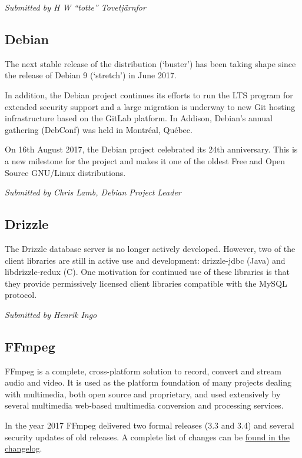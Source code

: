 \documentclass[a4paper]{report}
\begin{document}
{\em Submitted by H W ``totte'' Tovetjärnfor}

\subsection{Debian}

The next stable release of the distribution (`buster') has been taking
shape since the release of Debian 9 (`stretch') in June 2017.

In addition, the Debian project continues its efforts to run the LTS
program for extended security support and a large migration is underway
to new Git hosting infrastructure based on the GitLab platform. In
Addison, Debian's annual gathering (DebConf) was held in Montréal,
Québec.

On 16th August 2017, the Debian project celebrated its 24th anniversary.
This is a new milestone for the project and makes it one of the oldest
Free and Open Source GNU/Linux distributions.

{\em Submitted by Chris Lamb, Debian Project Leader}

\subsection{Drizzle}

The Drizzle database server is no longer actively developed. However,
two of the client libraries are still in active use and development:
drizzle-jdbc (Java) and libdrizzle-redux (C). One motivation for
continued use of these libraries is that they provide permissively
licensed client libraries compatible with the MySQL protocol.

{\em Submitted by Henrik Ingo}

\subsection{FFmpeg}

FFmpeg is a complete, cross-platform solution to record, convert and
stream audio and video. It is used as the platform foundation of many
projects dealing with multimedia, both open source and proprietary, and
used extensively by several multimedia web-based multimedia conversion
and processing services.

In the year 2017 FFmpeg delivered two formal releases (3.3 and 3.4) and
several security updates of old releases. A complete list of changes can
be \href{http://git.videolan.org/?p=ffmpeg.git;a=blob_plain;f=Changelog;hb=HEAD}{found
in the changelog}.
\end{document}
